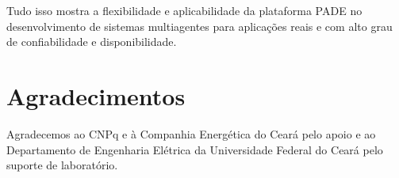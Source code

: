 \documentclass[journal]{IEEEtran}
\begin{document}
Tudo isso mostra a flexibilidade e aplicabilidade da plataforma PADE no desenvolvimento de sistemas multiagentes para aplicações reais e com alto grau de confiabilidade e disponibilidade.


\section*{Agradecimentos}

Agradecemos ao CNPq e à Companhia Energética do Ceará pelo apoio e ao Departamento de Engenharia Elétrica da Universidade Federal do Ceará pelo suporte de laboratório.


\ifCLASSOPTIONcaptionsoff
  \newpage
\fi





%
%
%
\end{document}
